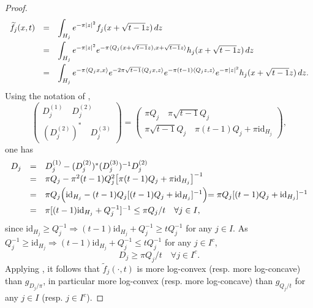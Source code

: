 \documentclass[11pt,a4paper,reqno]{amsart}
\numberwithin{equation}{section}
\theoremstyle{definition}
\newcommand{\nm}{\noalign{\smallskip}}
\newcommand{\ds}{\displaystyle}
\renewcommand{\tilde}{\widetilde}
\newcommand{\<}{\ensuremath \leq}
\renewcommand{\>}{\ensuremath \geq}
\renewcommand{\tilde}{\widetilde}
\begin{document}
\begin{proof}
$$\begin{array}{lll}
\tilde f_j(x,t) &=& \ds \int_{H_j}e^{-\pi |z|^2}f_j(x+\sqrt{t-1}z) \, dz \\
\nm 
&=& \ds \int_{H_j}e^{-\pi |z|^2}e^{-\pi \langle Q_j(x+\sqrt{t-1}z),x+\sqrt{t-1}z\rangle}h_j(x+\sqrt{t-1}z)\, dz \\
\nm 
&=& \ds \int_{H_j}e^{-\pi \langle Q_jx,x\rangle}e^{-2\pi \sqrt{t-1}\langle Q_jx,z\rangle}e^{-\pi(t-1)\langle Q_jz,z\rangle}e^{-\pi |z|^2} h_j(x+\sqrt{t-1}z)\, dz.
\end{array}$$ Using the notation of  \cite[Theorem 4.3]{Brascamp_Lieb}, $$\begin{pmatrix}
    D_j^{(1)} \quad D_j^{(2)} \\
    (D_j^{(2)})^* \quad D_j^{(3)}
\end{pmatrix}=\begin{pmatrix}
    \pi Q_j \quad \pi \sqrt{t-1}Q_j \\
    \pi \sqrt{t-1}Q_j \quad \pi(t-1)Q_j+\pi \mathrm{id}_{H_j}
\end{pmatrix},$$ one has $$\begin{array}{lll} D_j &=& D_j^{(1)}-(D_j^{(2)})^*(D_j^{(3)})^{-1}D_j^{(2)} \\ 
&=& \pi Q_j-\pi^2(t-1)Q_j^2 \bigl[\pi(t-1)Q_j+\pi \mathrm{id}_{H_j} \bigl]^{-1} \\
\nm 
&=& \pi Q_j\Bigl( \mathrm{id}_{H_j}-(t-1)Q_j[(t-1)Q_j+\mathrm{id}_{H_j}]^{-1} \Bigl)=\pi Q_j[(t-1)Q_j+\mathrm{id}_{H_j}]^{-1} \\
\nm 
&=& \pi [(t-1)\mathrm{id}_{H_j}+Q_j^{-1}]^{-1} \leq \pi Q_j/t \quad \forall j \in I,
\end{array}$$ since $\mathrm{id}_{H_j} \geq Q_j^{-1} \Longrightarrow (t-1)\mathrm{id}_{H_j}+Q_j^{-1} \geq tQ_j^{-1}$ for any $j \in I.$ 
As $Q_j^{-1} \ge \mathrm{id}_{H_j} \Longrightarrow (t-1)\mathrm{id}_{H_j}+Q_j^{-1} \le tQ_j^{-1}$ for any $j \in I^c$, $$D_j \ge \pi Q_j/t \quad \forall j \in I^c.$$ 
Applying \cite[Theorem 4.3]{Brascamp_Lieb}, it follows that $\tilde f_j(\cdot,t)$ is more log-convex (resp. more log-concave) than $g_{D_j/\pi}$, in particular more log-convex (resp. more log-concave) than $g_{Q_j/t}$ for any $j \in I$ (resp. $j \in I^c$).  




\end{proof}
\end{document}
